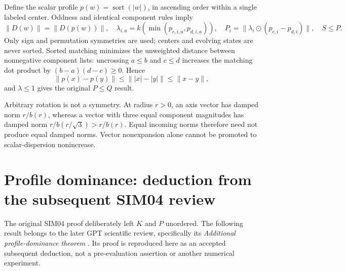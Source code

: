 \documentclass[11pt,a4paper]{article}
\begin{document}
Define the scalar profile $p(w)=\operatorname{sort}(|w|)$, in ascending order within a single labeled center. Oddness and identical component rules imply
\begin{equation}\label{eq:P}
\|D(w)\|=\|D(p(w))\|,\quad
\lambda_{i,a}=k(\min(p_{c,i,a},p_{d,i,a})),\quad
P_i=\|\lambda_i\odot(p_{c,i}-p_{d,i})\|,\quad S\le P.
\end{equation}
Only sign and permutation symmetries are used; centers and evolving states are never sorted. Sorted matching minimizes the unweighted distance between nonnegative component lists: uncrossing $a\le b$ and $c\le d$ increases the matching dot product by $(b-a)(d-c)\ge0$. Hence
\[
\|p(x)-p(y)\|\le\||x|-|y|\|\le\|x-y\|,
\]
and $\lambda\le1$ gives the original $P\le Q$ result.

Arbitrary rotation is not a symmetry. At radius $r>0$, an axis vector has damped norm $r/b(r)$, whereas a vector with three equal component magnitudes has damped norm $r/b(r/\sqrt3)>r/b(r)$. Equal incoming norms therefore need not produce equal damped norms. Vector nonexpansion alone cannot be promoted to scalar-dispersion nonincrease.

\clearpage
\section{Profile dominance: deduction from the subsequent SIM04 review}\label{sec:dominance}
The original SIM04 proof deliberately left $K$ and $P$ unordered. The following result belongs to the later GPT scientific review, specifically its \textit{Additional profile-dominance theorem} \cite{dominance}. Its proof is reproduced here as an accepted subsequent deduction, not a pre-evaluation assertion or another numerical experiment.
\end{document}
